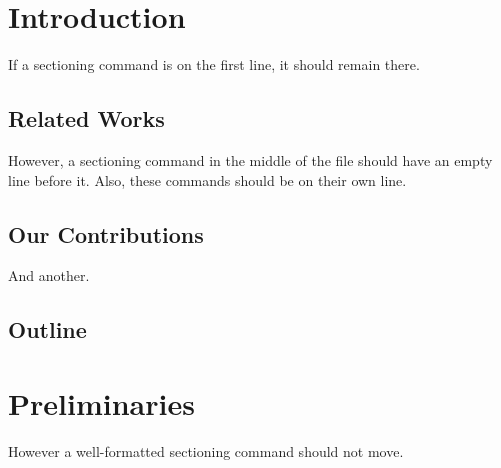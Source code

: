 \section{Introduction}

If a sectioning command is on the first line, it should remain there.
\subsection{Related Works}
However, a sectioning command in the middle of the file should have an empty line before it.
Also, these commands should be on their own line.\subsection{Our Contributions}And another.\subsection{Outline}

\section{Preliminaries}
However a well-formatted sectioning command should not move.
